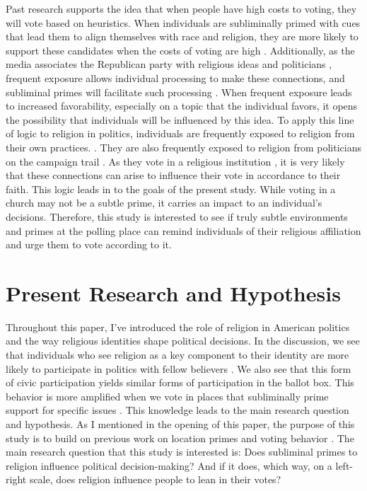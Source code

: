 \documentclass[letterpaper,man,natbib,noextraspace,12pt]{apa6}  %
\begin{document}
Past research supports the idea that when people have high costs to voting, they will vote based on heuristics. When individuals are subliminally primed with cues that lead them to align themselves with race and religion, they are more likely to support these candidates when the costs of voting are high \citep{kam_implicit_2007}. Additionally, as the media associates the Republican party with religious ideas and politicians \citep{calfano_god_2009, mclaughlin_cueing_2014}, frequent exposure allows individual processing to make these connections, and subliminal primes will facilitate such processing \citep{kahneman_thinking_2012}. When frequent exposure leads to increased favorability, especially on a topic that the individual favors, it opens the possibility that individuals will be influenced by this idea. To apply this line of logic to religion in politics, individuals are frequently exposed to religion from their own practices. \citep{putnam_american_2010}. They are also frequently exposed to religion from politicians on the campaign trail \citep{domke_god_2008}. As they vote in a religious institution \citep{rutchick_deus_2010}, it is very likely that these connections can arise to influence their vote in accordance to their faith. This logic leads in to the goals of the present study. While voting in a church may not be a subtle prime, it carries an impact to an individual’s decisions. Therefore, this study is interested to see if truly subtle environments and primes at the polling place can remind individuals of their religious affiliation and urge them to vote according to it. 

\section{Present Research and Hypothesis
}

Throughout this paper, I’ve introduced the role of religion in American politics and the way religious identities shape political decisions. In the discussion, we see that individuals who see religion as a key component to their identity are more likely to participate in politics with fellow believers \citep{putnam_american_2010}. We also see that this form of civic participation yields similar forms of participation in the ballot box. This behavior is more amplified when we vote in places that subliminally prime support for specific issues \citep{berger_contextual_2008, rutchick_deus_2010}. This knowledge leads to the main research question and hypothesis. As I mentioned in the opening of this paper, the purpose of this study is to build on previous work on location primes and voting behavior \citep{berger_contextual_2008}. The main research question that this study is interested is: Does subliminal primes to religion influence political decision-making? And if it does, which way, on a left-right scale, does religion influence people to lean in their votes?
\end{document}

